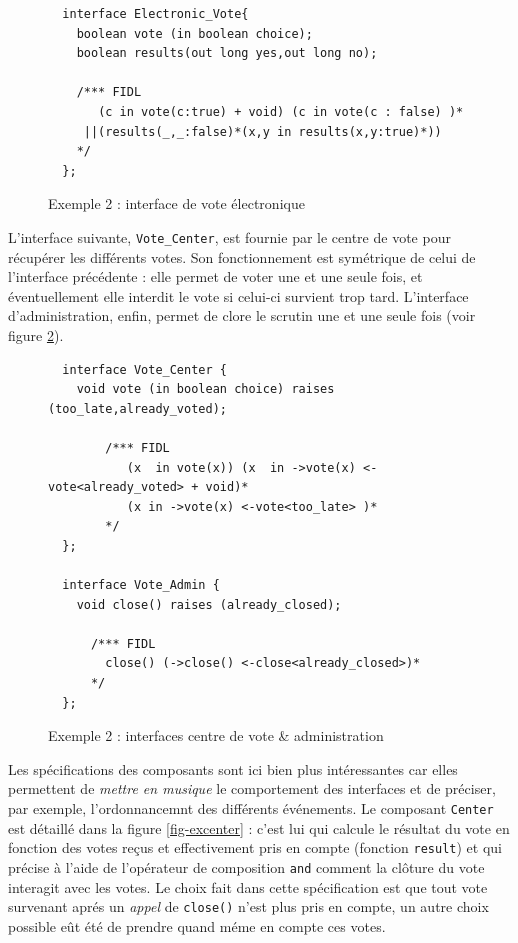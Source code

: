 \begin{figure}[htbp]
    \centering
\begin{lstlisting}
  interface Electronic_Vote{ 
    boolean vote (in boolean choice);
    boolean results(out long yes,out long no);
    
    /*** FIDL
       (c in vote(c:true) + void) (c in vote(c : false) )*
     ||(results(_,_:false)*(x,y in results(x,y:true)*)) 
    */
  };
\end{lstlisting}
        \caption{Exemple 2 : interface de vote \'electronique}
    \label{fig-exifacevote}
\end{figure}
  
L'interface suivante, \texttt{Vote\_Center}, est fournie par le centre
de vote pour r\'ecup\'erer les diff\'erents votes. Son
fonctionnement est sym\'etrique de celui de l'interface
pr\'ec\'edente : elle permet de voter une et une seule fois, et
\'eventuellement elle interdit le vote si celui-ci survient trop
tard. L'interface d'administration, enfin, permet de clore le
scrutin une et une seule fois (voir figure \ref{fig-exifacecenter}).

\begin{figure}[htbp]
    \centering
\begin{lstlisting}
  interface Vote_Center {
    void vote (in boolean choice) raises (too_late,already_voted);
    
        /*** FIDL
           (x  in vote(x)) (x  in ->vote(x) <-vote<already_voted> + void)*
           (x in ->vote(x) <-vote<too_late> )* 
        */
  };
    
  interface Vote_Admin {
    void close() raises (already_closed);
    
      /*** FIDL
        close() (->close() <-close<already_closed>)*
      */
  };
\end{lstlisting}
        \caption{Exemple 2 : interfaces centre de vote \& administration}
    \label{fig-exifacecenter}
\end{figure}


Les sp\'ecifications des composants sont ici bien plus
int\'eressantes car elles permettent de \emph{mettre en musique} le
comportement des interfaces et de pr\'eciser, par exemple,
l'ordonnancemnt des diff\'erents \'ev\'enements. Le composant \texttt{Center}
est d\'etaill\'e dans la figure \ref{fig-excenter} : c'est lui qui
calcule le r\'esultat du vote en fonction des votes re\c{c}us et
effectivement pris en compte (fonction \texttt{result}) et qui
pr\'ecise \`a l'aide de l'op\'erateur de composition \texttt{and} comment
la cl\^oture du vote interagit avec les votes. Le choix fait dans
cette sp\'ecification est que tout vote survenant apr\'es un
\emph{appel} de \texttt{close()} n'est plus pris en compte, un autre
choix possible e\^ut \'et\'e de  prendre quand m\'eme en compte
ces votes. 
 
